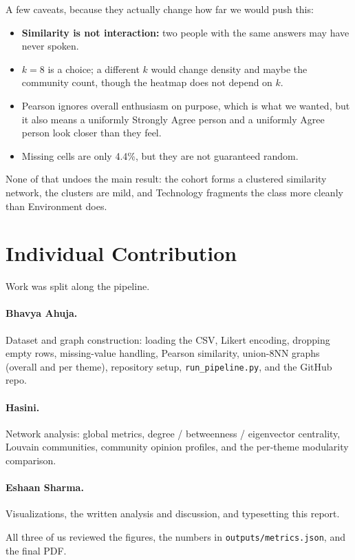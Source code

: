\documentclass[11pt,a4paper]{article}
\begin{document}
A few caveats, because they actually change how far we would push this:
\begin{itemize}
  \item \textbf{Similarity is not interaction:} two people with the same answers may have never spoken.
  \item $k=8$ is a choice; a different $k$ would change density and maybe the community count, though the heatmap does not depend on $k$.
  \item Pearson ignores overall enthusiasm on purpose, which is what we wanted, but it also means a uniformly Strongly Agree person and a uniformly Agree person look closer than they feel.
  \item Missing cells are only 4.4\%, but they are not guaranteed random.
\end{itemize}
None of that undoes the main result: the cohort forms a clustered similarity network, the clusters are mild, and Technology fragments the class more cleanly than Environment does.

\section{Individual Contribution}

Work was split along the pipeline.

\paragraph{Bhavya Ahuja.} Dataset and graph construction: loading the CSV, Likert encoding, dropping empty rows, missing-value handling, Pearson similarity, union-8NN graphs (overall and per theme), repository setup, \texttt{run\_pipeline.py}, and the GitHub repo.

\paragraph{Hasini.} Network analysis: global metrics, degree / betweenness / eigenvector centrality, Louvain communities, community opinion profiles, and the per-theme modularity comparison.

\paragraph{Eshaan Sharma.} Visualizations, the written analysis and discussion, and typesetting this report.

All three of us reviewed the figures, the numbers in \texttt{outputs/metrics.json}, and the final PDF.
\end{document}
